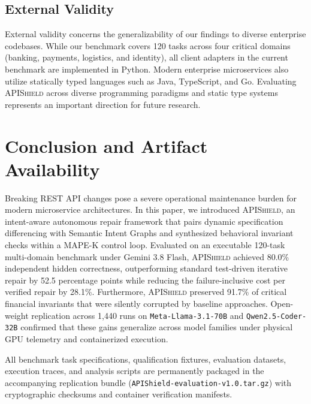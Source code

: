 \subsection{External Validity}
External validity concerns the generalizability of our findings to diverse enterprise codebases. While our benchmark covers 120 tasks across four critical domains (banking, payments, logistics, and identity), all client adapters in the current benchmark are implemented in Python. Modern enterprise microservices also utilize statically typed languages such as Java, TypeScript, and Go. Evaluating \textsc{APIShield} across diverse programming paradigms and static type systems represents an important direction for future research.

\section{Conclusion and Artifact Availability}
\label{sec:conclusion}

Breaking REST API changes pose a severe operational maintenance burden for modern microservice architectures. In this paper, we introduced \textsc{APIShield}, an intent-aware autonomous repair framework that pairs dynamic specification differencing with Semantic Intent Graphs and synthesized behavioral invariant checks within a MAPE-K control loop. Evaluated on an executable 120-task multi-domain benchmark under Gemini 3.8 Flash, \textsc{APIShield} achieved 80.0\% independent hidden correctness, outperforming standard test-driven iterative repair by 52.5 percentage points while reducing the failure-inclusive cost per verified repair by 28.1\%. Furthermore, \textsc{APIShield} preserved 91.7\% of critical financial invariants that were silently corrupted by baseline approaches. Open-weight replication across 1,440 runs on \texttt{Meta-Llama-3.1-70B} and \texttt{Qwen2.5-Coder-32B} confirmed that these gains generalize across model families under physical GPU telemetry and containerized execution.

All benchmark task specifications, qualification fixtures, evaluation datasets, execution traces, and analysis scripts are permanently packaged in the accompanying replication bundle (\texttt{APIShield-evaluation-v1.0.tar.gz}) with cryptographic checksums and container verification manifests.